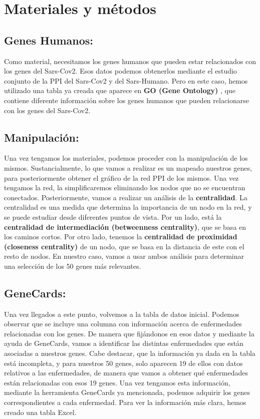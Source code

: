 \section{Materiales y métodos}

    \subsection{Genes Humanos:}
        Como material, necesitamos los genes humanos que pueden estar relacionados con los genes del Sars-Cov2. Esos datos podemos obtenerlos mediante el estudio conjunto de la PPI del Sars-Cov2 y del Sars-Humano. Pero en este caso, hemos utilizado una tabla ya creada que aparece en \textbf{GO (Gene Ontology)} , que contiene diferente información sobre los genes humanos que pueden relacionarse con los genes del Sars-Cov2.
        
    \subsection{Manipulación:}    
        Una vez tengamos los materiales, podemos proceder con la manipulación de los mismos. Sustancialmente, lo que vamos a realizar es un mapeado nuestros genes, para posteriormente obtener el gráfico de la red PPI de los mismos. Una vez tengamos la red, la simplificaremos eliminando los nodos que no se encuentran conectados. Posteriormente, vamos a realizar un análisis de la \textbf{centralidad}. La centralidad es una medida que determina la importancia de un nodo en la red, y se puede estudiar desde diferentes puntos de vista. Por un lado, está la \textbf{centralidad de intermediación (betweenness centrality)}, que se basa en los caminos cortos. Por otro lado, tenemos la \textbf{centralidad de proximidad (closeness centrality)} de un nodo, que se basa en la distancia de este con el resto de nodos. En nuestro caso, vamos a usar ambos análisis para determinar una selección de los 50 genes más relevantes.
    
    \subsection{GeneCards:}
        Una vez llegados a este punto, volvemos a la tabla de datos inicial. Podemos observar que se incluye una columna con información acerca de enfermedades relacionadas con los genes. De manera que fijándonos en esos datos y mediante la ayuda de GeneCards, vamos a identificar las distintas enfermedades que están asociadas a nuestros genes. Cabe destacar, que la información ya dada en la tabla está incompleta, y para nuestros 50 genes, solo aparecen 19 de ellos con datos relativos a las enfermedades, de manera que vamos a obtener qué enfermedades están relacionadas con esos 19 genes. Una vez tengamos esta información, mediante la herramienta GeneCards ya mencionada, podemos adquirir los genes correspondientes a cada enfermedad. Para ver la información más clara, hemos creado una tabla Excel. 
    
